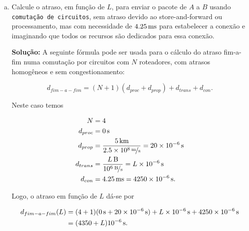 \documentclass{article}
\begin{document}
\begin{enumerate}
\begin{enumerate}[a)]
\begin{addmargin}[0.5in]{0.5in}
Logo, o atraso em função de $L$ dá-se por

\begin{equation} \label{eq2}
\begin{split}
d_{fim-a-fim}(L) & = (4 + 1)(\unit[10^{-6}]{s} + \unit[20 \times 10^{-6}]{s} + \unit[L \times 10^{-6}]{s}) \\
& = \unit[(21 + L)(5 \times 10^{-6})]{s}.
\end{split}
\end{equation}

\end{addmargin}

\item Calcule o atraso, em função de $L$, para enviar o pacote de $A$ a $B$ usando \texttt{comutação de circuitos}, sem atraso devido ao store-and-forward ou processamento, mas com necessidade de $\unit[4.25]{ms}$ para estabelecer a conexão e imaginando que todos os recursos são dedicados para essa conexão.

\begin{addmargin}[0.5in]{0.5in}
\par \textbf{Solução:} A seguinte fórmula pode ser usada para o cálculo do atraso fim-a-fim numa comutação por circuitos com $N$ roteadores, com atrasos homogêneos e sem congestionamento:

$$d_{fim-a-fim} = (N + 1)(d_{proc} + d_{prop}) + d_{trans} + d_{con}.$$

Neste caso temos

\begin{equation} \label{eq1}
\begin{split}
N & = 4 \\
d_{proc} & = \unit[0]{s}\\
d_{prop} & = \frac{\unit[5]{km}}{\unitfrac[2.5 \times 10^8]{m}{s}} = \unit[20 \times 10^{-6}]{s}\\
d_{trans} & = \frac{\unit[L]{B}}{\unitfrac[10^6]{B}{s}} = \unit[L \times 10^{-6}]{s}\\
d_{con} & = \unit[4.25]{ms} = \unit[4250 \times 10^{-6}]{s}.
\end{split}
\end{equation}

Logo, o atraso em função de $L$ dá-se por

\begin{equation} \label{eq2}
\begin{split}
d_{fim-a-fim}(L) & = (4 + 1)(\unit[0]{s} + \unit[20 \times 10^{-6}]{s}) + \unit[L \times 10^{-6}]{s} + \unit[4250 \times 10^{-6}]{s}\\
& = \unit[(4350 + L) 10^{-6}]{s}.
\end{split}
\end{equation}


\end{addmargin}
\end{enumerate}
\end{enumerate}
\end{document}
